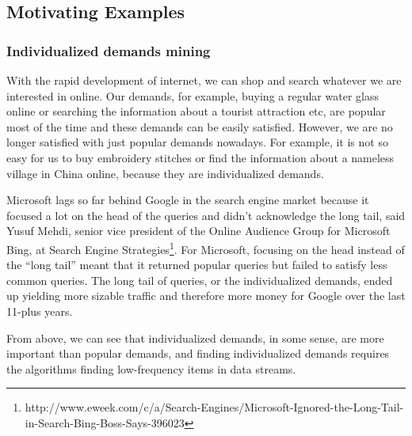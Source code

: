 \documentclass[conference]{IEEEtran}
\begin{document}
\subsection{Motivating Examples}
\subsubsection{Individualized demands mining}
With the rapid development of internet, we can shop and search whatever we are interested in online. Our demands, for example, buying a regular water glass online or searching the information about a tourist attraction etc, are popular most of the time and these demands can be easily satisfied. However, we are no longer satisfied with just popular demands nowadays. For example, it is not so easy for us to buy embroidery stitches or find the information about a nameless village in China online, because they are individualized demands.\par
Microsoft lags so far behind Google in the search engine market because it focused a lot on the head of the queries and didn't acknowledge the long tail, said Yusuf Mehdi, senior vice president of the Online Audience Group for Microsoft Bing, at Search Engine Strategies\footnote{http://www.eweek.com/c/a/Search-Engines/Microsoft-Ignored-the-Long-Tail-in-Search-Bing-Boss-Says-396023}. For Microsoft, focusing on the head instead of the ``long tail'' meant that it returned popular queries but failed to satisfy less common queries. The long tail of queries, or the individualized demands, ended up yielding more sizable traffic and therefore more money for Google over the last 11-plus years.\par
From above, we can see that individualized demands, in some sense, are more important than popular demands, and finding individualized demands requires the algorithms finding low-frequency items in data streams.
\end{document}
